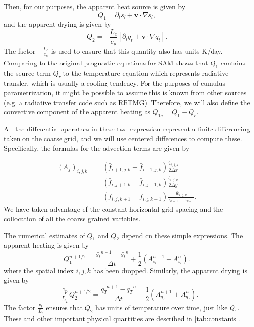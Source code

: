 \documentclass{report}
\begin{document}
Then, for our purposes, the apparent heat source is given by
\[Q_1 = \partial_t {s_l} + \mathbf{v}\cdot \nabla s_l, \]
and the apparent drying is given by
\[Q_2 = - \frac{L_c}{c_p} \left[\partial_t {q_t} + \mathbf{v} \cdot \nabla q_t\right].\]
The factor $-\frac{L_c}{c_p}$ is used to ensure that this quantity also has units K/day. Comparing to the original prognostic equations for SAM shows that $Q_1$ contains the source term  $Q_r$ to the temperature equation which represents radiative transfer, which is usually a cooling tendency. For the purposes of cumulus parametrization, it might be possible to assume this is known from other sources (e.g. a radiative transfer code such as RRTMG). Therefore, we will also define the convective component of the apparent heating as $Q_{1c} = Q_1 - Q_r$. 

All the differential operators in these two expression represent a finite
differencing taken on the coarse grid, and we will use centered differences to
compute these. Specifically, the formulas for the advection terms are given
by
\renewcommand{\bf}{\bar{f}_{i,j}}


\begin{align}
  (A_f)_{i,j,k} = &\left( \bar{f}_{i+1,j,k} - \bar{f}_{i-1,j,k} \right) \frac{\bar{u}_{i,j,k}}{2 \Delta x}\\
              +&\left( \bar{f}_{i,j+1,k} - \bar{f}_{i,j-1,k} \right) \frac{\bar{v}_{i,j,k}}{2 \Delta y}\nonumber\\
              +& \left(  \bar{f}_{i,j,k+1} - \bar{f}_{i,j,k-1} \right) \frac{\bar{w}_{i,j,k}}{z_{k+1} - z_{k-1}}.\nonumber
\end{align}
We have taken advantage of the constant horizontal grid spacing and the
collocation of all the coarse grained variables.

The numerical estimates of $Q_1$ and $Q_2$ depend on these simple expressions.
The apparent heating is given by
\begin{equation}
  \label{eq:q1-num}
  Q_1^{n+1/2} = \frac{\bar{s_l}^{n+1} - \bar{s_l}^{n} }{\Delta t}
            + \frac{1}{2} \left( A^{n+1}_{s_l}  + A^{n}_{s_l} \right).
\end{equation}
where the spatial index $i,j,k$ has been dropped. Similarly, the apparent
drying is given by
\begin{equation}
  \label{eq:q2-num}
  -\frac{c_p}{L_v} Q_2^{n+1/2} = \frac{\bar{q_T}^{n+1} - \bar{q_T}^{n} }{\Delta t}
            + \frac{1}{2} \left( A^{n+1}_{q_T}  + A^{n}_{q_T} \right).
\end{equation}
The factor $\frac{c_p}{L_v}$ ensures that $Q_2$ has units of temperature over
time, just like $Q_1$. These and other important physical quantities are
described in \autoref{tab:constants}.
\end{document}
